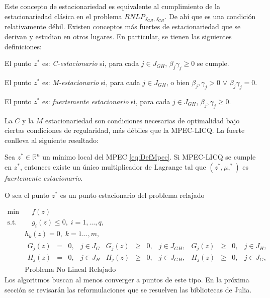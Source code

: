 Este concepto de estacionariedad es equivalente al cumplimiento de la estacionariedad clásica en el problema $RNLP_{J_{GH},J_{GH}}$. De ahí que  es una condición relativamente débil. Existen conceptos más fuertes de estacionariedad que se derivan y estudian en otros lugares. En particular, se tienen las siguientes definiciones:

 \begin{definition}
  El punto $z^*$ es: \textit{C-estacionario} si, para cada $j \in J_{GH}$, $\beta_j\gamma_j \geq 0$ se cumple.
\end{definition}
\begin{definition}
    El punto $z^*$ es: \textit{M-estacionario} si, para cada $j \in J_{GH}$, o bien $\beta_j,\gamma_j > 0$ $\vee$ $\beta_j \gamma_j = 0$.
\end{definition}
 \begin{definition}
    El punto $z^*$ es: \textit{fuertemente estacionario}  si, para cada $j \in J_{GH}$, $\beta_j, \gamma_j \geq 0$.
\end{definition}


La $C$ y la $M$ estacionariedad  son condiciones necesarias de optimalidad bajo ciertas condiciones de regularidad, más débiles que la  MPEC-LICQ. La fuerte conlleva al siguiente resultado:
\begin{theorem} 
Sea $z^* \in \mathbb{R}^n$ un mínimo local del MPEC \eqref{eq:DefMpec}. Si MPEC-LICQ se cumple en $z^*$, entonces existe un único multiplicador de Lagrange  tal que $(z^*, \mu, ^*)$ es \textit{fuertemente estacionario}.
\end{theorem}
O sea el punto $z^*$ es un punto estacionario del problema relajado 

\begin{equation}
\begin{array}{cl}
\min  &\quad  f(z)  \\
\text{s.t.} &\quad  g_i(z) \leq 0, \;i=1,\ldots,q, \\ &h_k(z) = 0,\;k=1\ldots,m, \\
&\begin{array}{ccccccccccccccccc}G_j(z) &=& 0, & j\in J_G& G_j(z) &\geq& 0, &j\in J_{GH},& G_j(z) &\geq& 0, & j\in J_H,\\ 
H_j(z) &=& 0, & j\in J_H& H_j(z) &\geq& 0, & j\in J_{GH},& H_j(z) &\geq& 0, & j\in J_G,\end{array}\\
& \text{Problema No Lineal Relajado }  
\end{array}
\label{eRNLP}
\end{equation}Los algoritmos buscan al menos converger a puntos de este tipo.  En la próxima sección se revisarán las reformulaciones que se resuelven  las bibliotecas de Julia.
